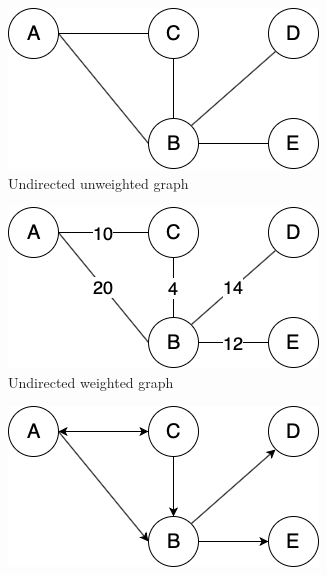 \begin{figure}[h!]
  \centering
  \begin{subfigure}[b]{0.18\linewidth}
    \includegraphics[width=\linewidth]{images/undirected_unweighted_graph.png}
     \caption{Undirected unweighted graph}
  \end{subfigure}
  \hfill
  \begin{subfigure}[b]{0.18\linewidth}
    \includegraphics[width=\linewidth]{images/undirected_weighted_graph.png}
    \caption{Undirected weighted graph}
  \end{subfigure}
  \hfill
  \begin{subfigure}[b]{0.18\linewidth}
    \includegraphics[width=\linewidth]{images/directed_unweighted_graph.png}

\end{subfigure}
\end{figure}
